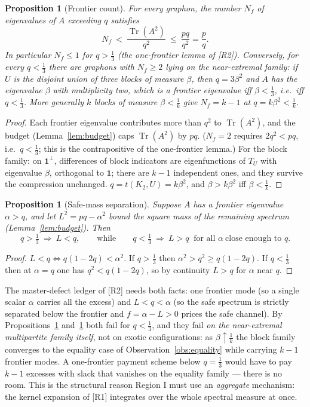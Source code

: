 \documentclass[11pt]{article}
\newtheorem{proposition}[theorem]{Proposition}
\theoremstyle{remark}
\theoremstyle{plain}
\theoremstyle{plain}
\newcommand{\one}{\mathbf 1}
\DeclareMathOperator{\Tr}{Tr}
\begin{document}
\begin{proposition}[Frontier count]\label{prop:frontier-count}
For every graphon, the number $N_f$ of eigenvalues of $A$ exceeding $q$
satisfies
\[
        N_f\ <\ \frac{\Tr(A^2)}{q^2}\ \le\ \frac{pq}{q^2}=\frac pq .
\]
In particular $N_f\le1$ for $q>\tfrac13$ (the one-frontier lemma of
[R2]).  Conversely, for every $q<\tfrac13$ there are graphons with
$N_f\ge2$ lying on the near-extremal family: if $U$ is the disjoint union
of three blocks of measure $\beta$, then $q=3\beta^2$ and $A$ has the
eigenvalue $\beta$ with multiplicity two, which is a frontier eigenvalue
iff $\beta<\tfrac13$, i.e.\ iff $q<\tfrac13$.  More generally $k$ blocks
of measure $\beta<\tfrac1k$ give $N_f=k-1$ at $q=k\beta^2<\tfrac1k$.
\end{proposition}

\begin{proof}
Each frontier eigenvalue contributes more than $q^2$ to $\Tr(A^2)$, and
the budget (Lemma~\ref{lem:budget}) caps $\Tr(A^2)$ by $pq$.  ($N_f=2$
requires $2q^2<pq$, i.e.\ $q<\tfrac13$; this is the contrapositive of the
one-frontier lemma.)  For the block family: on $\one^\perp$, differences
of block indicators are eigenfunctions of $T_U$ with eigenvalue $\beta$,
orthogonal to $\one$; there are $k-1$ independent ones, and they survive
the compression unchanged.  $q=t(K_2,U)=k\beta^2$, and $\beta>k\beta^2$
iff $\beta<\tfrac1k$.
\end{proof}

\begin{proposition}[Safe-mass separation]\label{prop:safe-mass}
Suppose $A$ has a frontier eigenvalue $\alpha>q$, and let
$L^2=pq-\alpha^2$ bound the square mass of the remaining spectrum
(Lemma~\ref{lem:budget}).  Then
\[
        q>\tfrac13\ \Longrightarrow\ L<q,
        \qquad\text{while}\qquad
        q<\tfrac13\ \Longrightarrow\ L>q
        \ \text{ for all }\alpha\ \text{close enough to }q .
\]
\end{proposition}

\begin{proof}
$L<q\iff q(1-2q)<\alpha^2$.  If $q>\tfrac13$ then
$\alpha^2>q^2\ge q(1-2q)$.  If $q<\tfrac13$ then at $\alpha=q$ one has
$q^2<q(1-2q)$, so by continuity $L>q$ for $\alpha$ near $q$.
\end{proof}

The master-defect ledger of [R2] needs both facts: one frontier mode (so
a single scalar $\alpha$ carries all the excess) and $L<q<\alpha$ (so the
safe spectrum is strictly separated below the frontier and $f=\alpha-L>0$
prices the safe channel).  By Propositions~\ref{prop:frontier-count}
and~\ref{prop:safe-mass} both fail for $q<\tfrac13$, and they fail
\emph{on the near-extremal multipartite family itself}, not on exotic
configurations: as $\beta\uparrow\tfrac1k$ the block family converges to
the equality case of Observation~\ref{obs:equality} while carrying $k-1$
frontier modes.  A one-frontier payment scheme below $q=\tfrac13$ would
have to pay $k-1$ excesses with slack that vanishes on the equality
family --- there is no room.  This is the structural reason Region I must
use an \emph{aggregate} mechanism: the kernel expansion of [R1]
integrates over the whole spectral measure at once.
\end{document}
